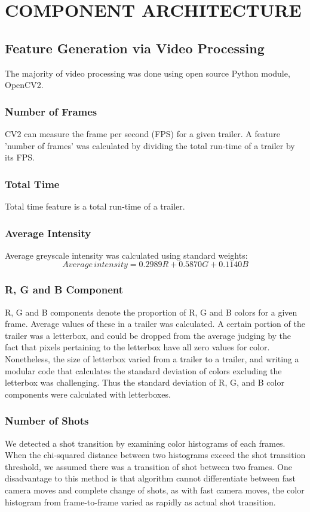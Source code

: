 \documentclass[letterpaper, 10 pt, conference]{ieeeconf}  %
\begin{document}
\section{COMPONENT ARCHITECTURE}
\subsection{Feature Generation via Video Processing}
The majority of video processing was done using open source Python module, OpenCV2. 
\subsubsection{Number of Frames}
CV2 can measure the frame per second (FPS) for a given trailer. A feature 'number of frames' was calculated by dividing the total run-time of a trailer by its FPS.
\subsubsection{Total Time}
Total time feature is a total run-time of a trailer.
\subsubsection{Average Intensity}
Average greyscale intensity was calculated using standard weights:
\begin{equation*}
Average\,intensity= 0.2989R+0.5870G+0.1140B
\end{equation*}
\subsubsection{R, G and B Component}
R, G and B components denote the proportion of R, G and B colors for a given frame. Average values of these in a trailer was calculated. A certain portion of the trailer was a letterbox, and could be dropped from the average judging by the fact that pixels pertaining to the letterbox have all zero values for color. Nonetheless, the size of letterbox varied from a trailer to a trailer, and writing a modular code that calculates the standard deviation of colors excluding the letterbox was challenging. Thus the standard deviation of R, G, and B color components were calculated with letterboxes.

\subsubsection{Number of Shots}
We detected a shot transition by examining color histograms of each frames. When the chi-squared distance between two histograms exceed the shot transition threshold, we assumed there was a transition of shot between two frames. One disadvantage to this method is that algorithm cannot differentiate between fast camera moves and complete change of shots, as with fast camera moves, the color histogram from frame-to-frame varied as rapidly as actual shot transition.
\end{document}
